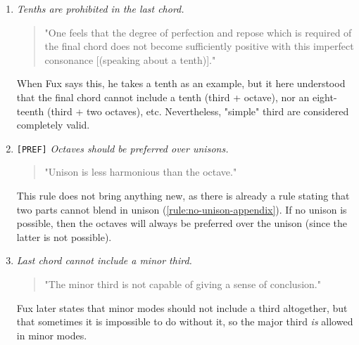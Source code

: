 \begin{enumerate}[wide, label=\bfseries 1.H\arabic*]
    \item\label{rule:tenth-is-last-chord}  \textit{Tenths are prohibited in the last chord.}

    \begin{quotation}
    "One feels that the degree of perfection and repose which is required of the final chord does not become sufficiently positive with this imperfect consonance [(speaking about a tenth)]."
    \textcite[p.77]{GaPEng}
    \end{quotation}

    When Fux says this, he takes a tenth as an example, but it here understood that the final chord cannot include a tenth (third + octave), nor an eight-teenth (third + two octaves), etc. Nevertheless, "simple" third are considered completely valid.

    \item\label{rule:unison-vs-octave} \texttt{[PREF]} \textit{Octaves should be preferred over unisons.}

    \begin{quotation}
    "Unison is less harmonious than the octave."
    \textcite[p.79]{GaPEng}
    \end{quotation}

    This rule does not bring anything new, as there is already a rule stating that two parts cannot blend in unison (\ref{rule:no-unison-appendix}). If no unison is possible, then the octaves will always be preferred over the unison (since the latter is not possible).

    \item\label{rule:minor-third}  \textit{Last chord cannot include a minor third.}

    \begin{quotation}
    "The minor third is not capable of giving a sense of conclusion."
    \textcite[p.80]{GaPEng}
    \end{quotation}

    Fux later states that minor modes should not include a third altogether, but that sometimes it is impossible to do without it, so the major third \textit{is} allowed in minor modes.

\end{enumerate}

